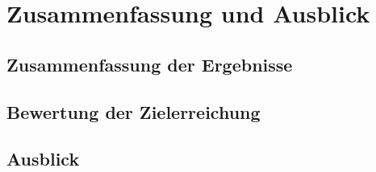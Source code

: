 \chapter{Zusammenfassung und Ausblick}

\section{Zusammenfassung der Ergebnisse}

\section{Bewertung der Zielerreichung}

\section{Ausblick}
